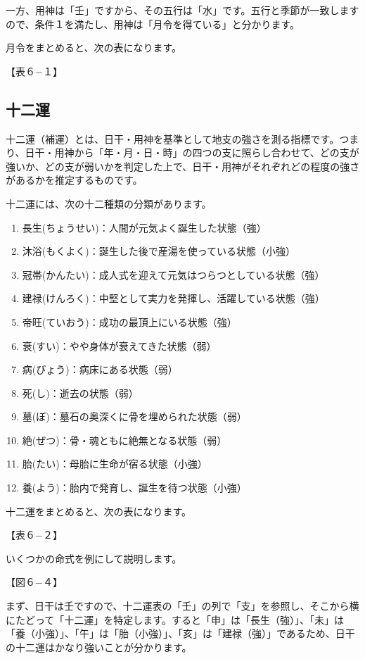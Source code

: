 \documentclass[a5paper,11pt,dvipdfmx]{tarticle}
\begin{document}
一方、用神は「壬」ですから、その五行は「水」です。五行と季節が一致しますので、条件１を満たし、用神は「月令を得ている」と分かります。

月令をまとめると、次の表になります。

【表６−１】

\subsection{十二運}
十二運（補運）とは、日干・用神を基準として地支の強さを測る指標です。つまり、日干・用神から「年・月・日・時」の四つの支に照らし合わせて、どの支が強いか、どの支が弱いかを判定した上で、日干・用神がそれぞれどの程度の強さがあるかを推定するものです。

十二運には、次の十二種類の分類があります。

\begin{enumerate}
\item 長生(ちょうせい)：人間が元気よく誕生した状態（強）
\item 沐浴(もくよく)：誕生した後で産湯を使っている状態（小強）
\item 冠帯(かんたい)：成人式を迎えて元気はつらつとしている状態（強）
\item 建禄(けんろく)：中堅として実力を発揮し、活躍している状態（強）
\item 帝旺(ていおう)：成功の最頂上にいる状態（強）
\item 衰(すい)：やや身体が衰えてきた状態（弱）
\item 病(びょう)：病床にある状態（弱）
\item 死(し)：逝去の状態（弱）
\item 墓(ぼ)：墓石の奥深くに骨を埋められた状態（弱）
\item 絶(ぜつ)：骨・魂ともに絶無となる状態（弱）
\item 胎(たい)：母胎に生命が宿る状態（小強）
\item 養(よう)：胎内で発育し、誕生を待つ状態（小強）
\end{enumerate}

十二運をまとめると、次の表になります。

【表６−２】

いくつかの命式を例にして説明します。

【図６−４】

まず、日干は壬ですので、十二運表の「壬」の列で「支」を参照し、そこから横にたどって「十二運」を特定します。すると「申」は「長生（強）」、「未」は「養（小強）」、「午」は「胎（小強）」、「亥」は「建禄（強）」であるため、日干の十二運はかなり強いことが分かります。
\end{document}
